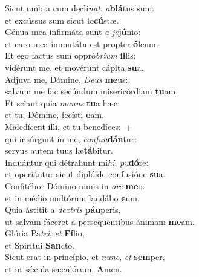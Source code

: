 \evenverse Sicut umbra cum declí\textit{nat}, \textit{a}\textbf{blá}tus sum:~\*\\
\evenverse et excússus sum sicut lo\textbf{cú}stæ.\\
\oddverse Génua mea infirmáta sunt \textit{a} \textit{je}\textbf{jú}nio:~\*\\
\oddverse et caro mea immutáta est propter \textbf{ó}leum.\\
\evenverse Et ego factus sum oppró\textit{bri}\textit{um} \textbf{il}lis:~\*\\
\evenverse vidérunt me, et movérunt cápita \textbf{su}a.\\
\oddverse Adjuva me, Dómine, \textit{De}\textit{us} \textbf{me}us:~\*\\
\oddverse salvum me fac secúndum misericórdiam \textbf{tu}am.\\
\evenverse Et sciant quia \textit{ma}\textit{nus} \textbf{tu}a hæc:~\*\\
\evenverse et tu, Dómine, fecísti \textbf{e}am.\\
\oddverse Maledícent illi, et tu benedíces:~+\\
\oddverse  qui insúrgunt in me, \textit{con}\textit{fun}\textbf{dán}tur:~\*\\
\oddverse servus autem tuus læ\textbf{tá}bitur.\\
\evenverse Induántur qui détrahunt mi\textit{hi}, \textit{pu}\textbf{dó}re:~\*\\
\evenverse et operiántur sicut diplóide confusióne \textbf{su}a.\\
\oddverse Confitébor Dómino nimis in \textit{o}\textit{re} \textbf{me}o:~\*\\
\oddverse et in médio multórum laudábo \textbf{e}um.\\
\evenverse Quia ástitit a \textit{dex}\textit{tris} \textbf{páu}peris,~\*\\
\evenverse ut salvam fáceret a persequéntibus ánimam \textbf{me}am.\\
\oddverse Glória Pa\textit{tri}, \textit{et} \textbf{Fí}lio,~\*\\
\oddverse et Spirítui \textbf{San}cto.\\
\evenverse Sicut erat in princípio, et \textit{nunc}, \textit{et} \textbf{sem}per,~\*\\
\evenverse et in sǽcula sæculórum. \textbf{A}men.\\
